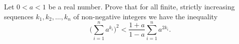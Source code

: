 Let $0 < a < 1$ be a real number. Prove that for all finite, strictly increasing sequences $k_1, k_2, \ldots , k_n$ of non-negative integers we have the inequality
\[\biggl( \sum_{i=1}^n a^{k_i} \biggr)^2 < \frac{1+a}{1-a} \sum_{i=1}^n a^{2k_i}.\]